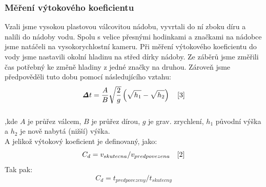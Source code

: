 \documentclass[14pt,a4paper]{article}
\begin{document}
\subsubsection{Měření výtokového koeficientu}
Vzali jsme vysokou plastovou válcovitou nádobu, vyvrtali do ní zboku díru a nalili do nádoby vodu. Spolu s velice přesnými hodinkami a značkami na nádobce jsme natáčeli na vysokorychlostní kameru. Při měření výtokového koeficientu do vody jsme nastavili okolní hladinu na střed dírky nádoby. Ze záběrů jsme změřili čas potřebný ke změně hladiny z jedné značky na druhou. Zároveň jsme předpověděli tuto dobu pomocí následujícího vztahu:
\begin{equation}
\bm{\mathit{\Delta}} t=\frac{A}{B}\sqrt{\frac{2}{g}}\left(\sqrt{h_1}-\sqrt{h_2}\right) \quad \cite{3}
\end{equation}
\subparagraph{}
,kde $A$ je průřez válcem, $B$ je průřez dírou, $g$ je grav. zrychlení, $h_1$ původní výška a $h_2$ je nově nabytá (nižší) výška.\\
A jelikož výtokový koeficient je definovaný, jako:
\begin{equation*}
C_d=v_{skutecna}/v_{predpovezena} \quad \cite{2}
\end{equation*}
Tak pak:   \quad \quad \quad \quad 
\begin{equation}
C_d=t_{predpovezeny}/t_{skutecny}
\label{rovnice vytok}
\end{equation}
\label{mereni vytok}
\newpage
\end{document}
